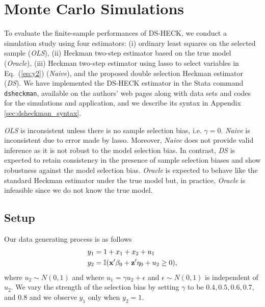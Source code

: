\documentclass[11pt]{article}
\begin{document}


\section{Monte Carlo Simulations} \label{sec:sim}

To evaluate the finite-sample performances of DS-HECK, we conduct a simulation study using four estimators: (i) ordinary least squares on the selected sample (\emph{OLS}), (ii) Heckman two-step estimator based on the true model (\emph{Oracle}), (iii) Heckman two-step estimator using lasso to select variables
in Eq.~(\ref{eq:y2}) (\emph{Naive}), and the proposed double selection Heckman estimator (\emph{DS}). We have implemented the DS-HECK estimator in the Stata
command {\tt dsheckman}, available on the authors' web pages along with data sets and codes for the simulations and application, and we describe its syntax in Appendix \ref{sec:dsheckman_syntax}.

\emph{OLS} is inconsistent unless there is no sample selection bias, i.e. $\gamma=0$.  \emph{Naive} is inconsistent due to error made by lasso. Moreover, \emph{Naive} does not provide valid inference as it is not robust to the
model selection bias. In contrast, \emph{DS} is expected to retain consistency in the presence of sample selection biases and show robustness against the model
selection bias. \emph{Oracle} is expected to behave like the standard Heckman
estimator under the true model but, in practice, \emph{Oracle}
is infeasible since we do not know the true model.
\subsection{Setup}

Our data generating process is as follows
\begin{align*}
y_1 & = 1 + x_1 + x_2 + u_1\\
y_2 &= \mathbb{I} ( \mathbf{x}' \beta_0 + \mathbf{z}'\eta_0 + u_2 \ge 0), 
\end{align*}
where $u_2 \sim N(0, 1)$ and where $u_1 = \gamma u_2 + \epsilon$ and $\epsilon \sim N(0, 1)$ is independent of $u_2$. We vary the strength  of the selection bias by setting $\gamma$ to be $0.4, 0.5, 0.6, 0.7$, and $0.8$ and we observe $y_1$ only when $y_2 = 1$.
\end{document}
